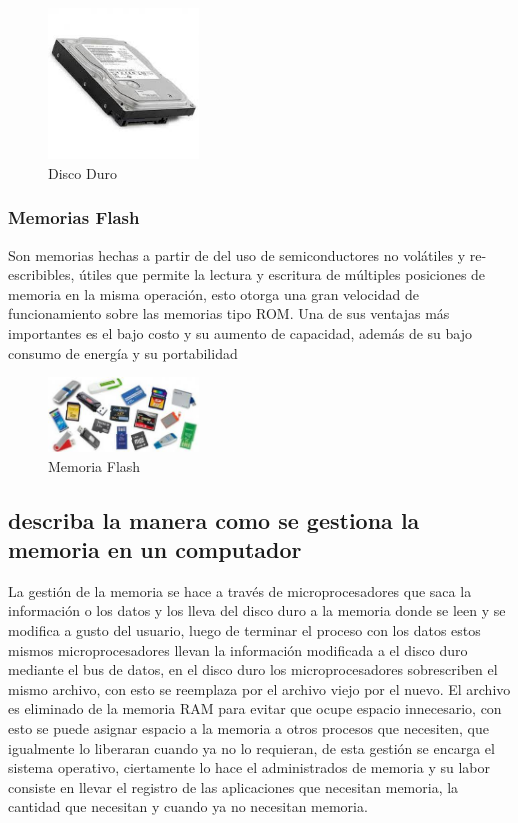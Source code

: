 \documentclass{article}
\begin{document}
        \begin{figure}[h]
        \includegraphics[width=4cm]{discoDuro.jpg}
        \centering
        \caption{Disco Duro}
        \label{fig:discoDuro}
        \end{figure}
        
        
        \subsubsection{Memorias Flash}
        Son memorias hechas a partir de del uso de semiconductores no volátiles y re-escribibles, útiles que permite la lectura y escritura de múltiples posiciones de memoria en la misma operación, esto otorga una gran velocidad de funcionamiento sobre las memorias tipo ROM. Una de sus ventajas más importantes es el bajo costo y su aumento de capacidad, además de su bajo consumo de energía y su portabilidad 
        
        \begin{figure}[h]
        \includegraphics[width=4cm]{flash.jpg}
        \centering
        \caption{Memoria Flash}
        \label{fig:flash}
        \end{figure}
    
    
    \subsection{describa la manera como se gestiona la memoria en un computador}
    La gestión de la memoria se hace a través de microprocesadores que saca la información o los datos y los lleva del disco duro a la memoria donde se  leen y se modifica a gusto del usuario, luego de terminar el proceso con los datos estos mismos microprocesadores llevan la información modificada a el disco duro mediante el bus de datos, en el disco duro los microprocesadores sobrescriben el mismo archivo, con esto se reemplaza por el archivo viejo por el nuevo. 
    El archivo es eliminado de la memoria RAM para evitar que ocupe espacio innecesario, con esto se puede asignar espacio a la memoria a otros procesos que necesiten, que igualmente lo liberaran cuando ya no lo requieran, de esta gestión se encarga el sistema operativo, ciertamente lo hace el administrados de memoria y su labor consiste en llevar el registro de las aplicaciones que necesitan memoria, la cantidad que necesitan y cuando ya no necesitan memoria.
 
\end{document}
